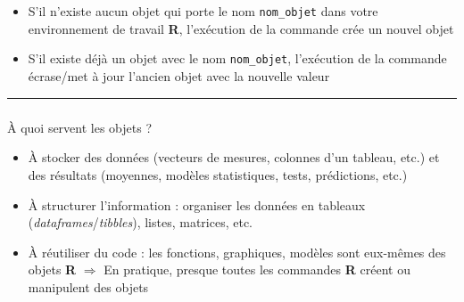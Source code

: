 \documentclass[
  french,
  10pt,
  a4paper,
]{article}
\makeatletter
\let\oldsubparagraph\subparagraph
\renewcommand{\subparagraph}{
    \@ifstar
      \xxxSubParagraphStar
      \xxxSubParagraphNoStar
  }
\newcommand{\xxxSubParagraphStar}[1]{\oldsubparagraph*{#1}\mbox{}}
\newcommand{\xxxSubParagraphNoStar}[1]{\oldsubparagraph{#1}\mbox{}}
\providecommand{\tightlist}{%
  \setlength{\itemsep}{0pt}\setlength{\parskip}{0pt}}
\makeatother
\begin{document}
\begin{tcolorbox}[enhanced jigsaw, arc=.35mm, bottomrule=.15mm, bottomtitle=1mm, breakable, colback=white, colbacktitle=quarto-callout-note-color!10!white, colframe=quarto-callout-note-color-frame, coltitle=black, left=2mm, leftrule=.75mm, opacityback=0, opacitybacktitle=0.6, rightrule=.15mm, title=\textcolor{quarto-callout-note-color}{\faInfo}\hspace{0.5em}{Note}, titlerule=0mm, toprule=.15mm, toptitle=1mm]

\begin{itemize}
\tightlist
\item
  S'il n'existe aucun objet qui porte le nom \texttt{nom\_objet} dans
  votre environnement de travail \textbf{R}, l'exécution de la commande
  crée un nouvel objet
\item
  S'il existe déjà un objet avec le nom \texttt{nom\_objet}, l'exécution
  de la commande écrase/met à jour l'ancien objet avec la nouvelle
  valeur
\end{itemize}

\end{tcolorbox}

\begin{center}\rule{0.5\linewidth}{0.5pt}\end{center}

\subparagraph{À quoi servent les objets
?}\label{uxe0-quoi-servent-les-objets}

\begin{itemize}
\tightlist
\item
  À stocker des données (vecteurs de mesures, colonnes d'un tableau,
  etc.) et des résultats (moyennes, modèles statistiques, tests,
  prédictions, etc.)
\item
  À structurer l'information : organiser les données en tableaux
  (\emph{dataframes}/\emph{tibbles}), listes, matrices, etc.
\item
  À réutiliser du code : les fonctions, graphiques, modèles sont
  eux-mêmes des objets \textbf{R} \(\Rightarrow\) En pratique, presque
  toutes les commandes \textbf{R} créent ou manipulent des objets
\end{itemize}
\end{document}
